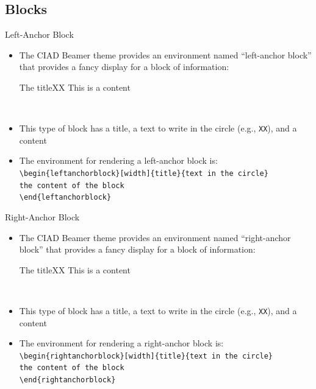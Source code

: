 \documentclass[english,sectioncirclenumberstyle]{ciadbeamer}
\begin{document}
\subsection{Blocks}
\subsectiontableofcontentslide

\begin{frame}{Left-Anchor Block}
	\begin{itemize}
		\item The CIAD Beamer theme provides an environment named ``left-anchor block'' that provides a fancy display for a block of information: \\[.25cm]
			\begin{leftanchorblock}{The title}{XX}
				This is a content
			\end{leftanchorblock} \\[.5cm]
		\item This type of block has a title, a text to write in the circle (e.g., \texttt{XX}), and a content
		\item The environment for rendering a left-anchor block is: \\[.25cm]
			\texttt{{\textbackslash}begin\{leftanchorblock\}[width]\{title\}\{text in the circle\}} \\
			\mbox{}\hspace{.2cm}\texttt{the content of the block} \\
			\texttt{{\textbackslash}end\{leftanchorblock\}}
	\end{itemize}
\end{frame}

\begin{frame}{Right-Anchor Block}
	\begin{itemize}
		\item The CIAD Beamer theme provides an environment named ``right-anchor block'' that provides a fancy display for a block of information: \\[.25cm]
		\begin{rightanchorblock}{The title}{XX}
			This is a content
		\end{rightanchorblock} \\[.5cm]
		\item This type of block has a title, a text to write in the circle (e.g., \texttt{XX}), and a content
		\item The environment for rendering a right-anchor block is: \\[.25cm]
		\texttt{{\textbackslash}begin\{rightanchorblock\}[width]\{title\}\{text in the circle\}} \\
		\mbox{}\hspace{.2cm}\texttt{the content of the block} \\
		\texttt{{\textbackslash}end\{rightanchorblock\}}
	\end{itemize}
\end{frame}
\end{document}
